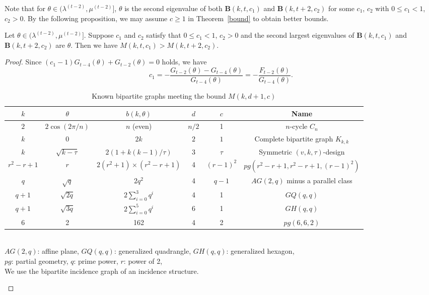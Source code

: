 \documentclass[ALCO,ThmDefs,Unicode,epreuves]{cedram}
\begin{document}
Note that for $\theta \in ( \lambda^{(t-2)}, \mu^{(t-2)}]$, $\theta$ is the second eigenvalue of both $\boldsymbol{B}(k,t,c_1)$ and $\boldsymbol{B}(k,t+2,c_2)$ for some $c_1$, $c_2$ with $0\leq c_1 < 1$, $c_2 > 0$. By the following proposition, we may assume $c\geq 1$ in Theorem~\ref{bound} to obtain better bounds. 

\begin{prop} \label{prop:c} 
Let $\theta\in \mathopen(\lambda^{(t-2)}, \mu^{(t-2)} \mathclose]$. 
Suppose $c_1$ and $c_2$ satisfy that $0\leq c_1 < 1$, $c_2 > 0$ and the second largest eigenvalues of $\boldsymbol{B}(k,t,c_1)$ and $\boldsymbol{B}(k,t+2,c_2)$ are $\theta$. 
Then we have $M(k,t,c_1)>M(k,t+2,c_2)$. 
\end{prop}
\begin{proof}
Since $(c_1-1)G_{t-4}(\theta)+G_{t-2}(\theta)=0$ holds, we have
 \[
c_1=-\frac{G_{t-2}(\theta)-G_{t-4}(\theta)}{G_{t-4}(\theta)}=-\frac{F_{t-2}(\theta)}{G_{t-4}(\theta)}. 
\]

\begin{landscape}
\begin{table}[htb]\centering
\vspace*{28mm}
\renewcommand{\arraystretch}{1.4}
\caption{Known bipartite graphs meeting the bound $M(k,d+1,c)$}\label{tab:1}
\begin{tabular}{|c|c|c|c|c|c|} 
\hline
$k$& $\theta$ & $b(k,\theta)$& $d$& $c$ &Name \\
\hline 
$2$&$2\cos(2\pi/n)$ & $n$ (even) & $n/2$& 1 & $n$-cycle $C_n$ \\
$k$&$0$ & $2k$& $2$ & $1$ & Complete bipartite graph $K_{k,k}$ \\
$k$& $\sqrt{k-\tau}$ & $2 (1+k(k-1)/\tau )$ & 3& $\tau$ & {%
Symmetric $(v,k,\tau)$-design } \\ 
{%
$r^2-r+1$} &$r$ & 
{%
$2(r^2+1)\times
(r^2-r+1)
$} &4 & 
{%
$(r-1)^2$}
& {%
$pg(r^2-r+1,r^2-r+1,(r-1)^2)$}\\
$q$&$\sqrt{q}$& $2q^2$ &4&$q-1$&$AG(2,q)$ minus a parallel class \\
$q+1$&$\sqrt{2q}$&$2\sum_{i=0}^3 q^i$ &4&1 & $GQ(q,q)$ \\
$q+1$&$\sqrt{3q}$ & $2\sum_{i=0}^5 q^i$ &6&1&$GH(q,q)$ \\
6 & 2& 162 & 4 & 2 & $pg(6,6,2)$ \\
\hline
\end{tabular}\\
\vrule height12pt width0pt $AG(2,q)$: affine plane, $GQ(q,q)$: generalized quadrangle, $GH(q,q)$: generalized hexagon, \\
$pg$: partial geometry, $q$: prime power, $r$: power of 2, \\
We use the bipartite incidence graph of an incidence structure. 
\end{table}
\end{landscape}


\end{proof}
\end{document}
